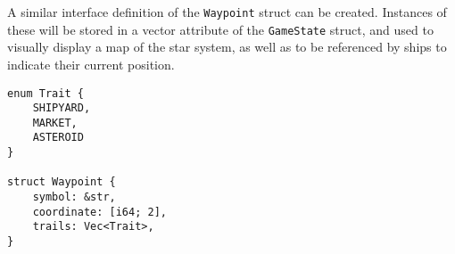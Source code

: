 A similar interface definition of the \texttt{Waypoint} struct can be created. Instances of these will be stored in a vector attribute of the \texttt{GameState} struct, and used to visually display a map of the star system, as well as to be referenced by ships to indicate their current position.
\begin{lstlisting}
enum Trait {
    SHIPYARD,
    MARKET,
    ASTEROID
}

struct Waypoint {
    symbol: &str,
    coordinate: [i64; 2],
    trails: Vec<Trait>,
}
\end{lstlisting}